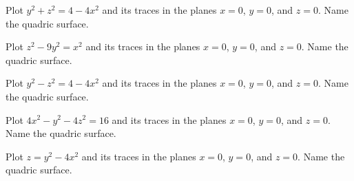 \documentclass[letterpaper, twoside, 12pt]{book}
\begin{document}
          \begin{problem}
            Plot $y^2+z^2=4-4x^2$ and its traces in the planes $x=0$, $y=0$,
            and $z=0$.
            Name the quadric surface.
          \end{problem}

          \begin{solution}

          \end{solution}

          \begin{problem}
            Plot $z^2-9y^2=x^2$ and its traces in the planes $x=0$, $y=0$,
            and $z=0$.
            Name the quadric surface.
          \end{problem}

          \begin{solution}

          \end{solution}

          \begin{problem}
            Plot $y^2-z^2=4-4x^2$ and its traces in the planes $x=0$, $y=0$,
            and $z=0$.
            Name the quadric surface.
          \end{problem}

          \begin{solution}

          \end{solution}

          \begin{problem}
            Plot $4x^2-y^2-4z^2=16$ and its traces in the planes $x=0$, $y=0$,
            and $z=0$.
            Name the quadric surface.
          \end{problem}

          \begin{solution}

          \end{solution}

          \begin{problem}
            Plot $z=y^2-4x^2$ and its traces in the planes $x=0$, $y=0$,
            and $z=0$.
            Name the quadric surface.
          \end{problem}

          \begin{solution}

          \end{solution}
\end{document}

